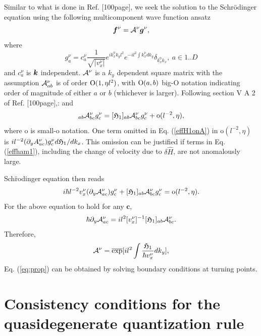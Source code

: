 \documentclass[aps, prb, showpacs, twocolumn, notitlepage, superscriptaddress]{revtex4-1}
\begin{document}
Similar to what is done in Ref. [100page], we seek the solution to the Schr\"odinger equation using the following multicomponent wave function ansatz
\begin{equation}
\boldsymbol{f}^\nu={\cal A}^\nu\boldsymbol{g}^\nu,
\end{equation}
where 
\begin{equation}
g_a^\nu=c_{a}^\nu\frac{1}{\sqrt{|v_x^\nu|}}e^{ik^{0}_{x}k_{y}l^{2}}e^{-il^{2}\int k_{x}^\nu dk_{y}}\delta_{k^{0}_{x}k_{x}},~a\in{1..D}
\end{equation}
and $c_a^\nu$ is $\boldsymbol{k}$ independent. ${\cal A}^\nu$ is a $k_y$ dependent square matrix with the assumption ${\cal A}_{ab}^\nu$ is of order $\text{O}(1, \eta l^2)$, with $\text{O}(a, b)$ big-O notation indicating order of magnitude of either $a$ or $b$ (whichever is larger). Following section V A 2 of Ref. [100page],:
and
\begin{equation}
[\effH_{1}(\bK)]_{ab}\A_{bc}^\nu g_{c}^\nu=[\effH_{1}]_{ab}\A_{bc}^\nu g_{c}^\nu+\text{o}(l^{-2}, \eta),\label{effH1onA}
\end{equation}
where $\text{o}$ is small-o notation. One term omitted in Eq. (\ref{effH1onA}) in $\text{o}(l^{-2},\eta)$ is $i l^{-2}(\partial_{y}A_{ac}^\nu)g_{c}^\nu d\mathfrak{H}_1/dk_x$. This omission can be justified if terms in Eq. ({\ref{effham1}}), including the change of velocity due to $\delta\hat{H}$, are not anomalously large.

Sch\"rodinger equation then reads 
\begin{equation}
i\hbar l^{-2} v_{x}^\nu (\partial_{y}{\cal A}_{ac}^\nu)  g_{c}^\nu+[\mathfrak{H}_{1}]_{ab}{\cal A}_{bc}^\nu g_{c}^\nu=\text{o}(l^{-2}, \eta).
\end{equation}
For the above equation to hold for any $\mathbf{c}$,
\begin{equation}
\hbar\partial_{y}{\cal A}_{ac}^\nu=il^{2}[v_{x}^\nu]^{-1}[\mathfrak{H}_{1}]_{ab}{\cal A}_{bc}^\nu.
\end{equation}
Therefore,
\begin{equation}
{\cal A}^\nu=\overline{\exp}[il^{2}\int\frac{\mathfrak{H}_{1}}{\hbar v_{x}^\nu}dk_{y}],
\end{equation}
Eq. ({\ref{eq:prop}}) can be obtained by solving boundary conditions at turning points.

\section{Consistency conditions for the quasidegenerate quantization rule}\label{sec:slowvariation}
\end{document}
